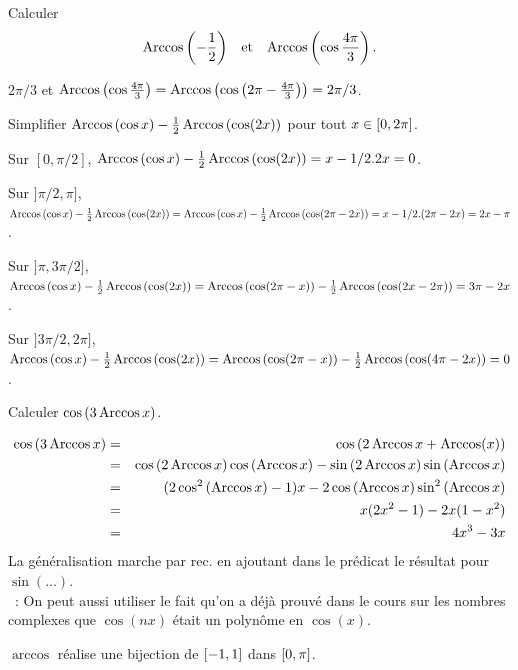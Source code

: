 \documentclass{magnoliaold}
\begin{document}
\begin{exos}
\exemple Calculer
  \[\operatorname{Arccos}\left(-\frac{1}{2}\right) \quad\!\text{et}\quad\! \operatorname{Arccos}\left(\cos\frac{4\pi}{3}\right).\]
  \begin{sol}
  $2\pi/3$ et $\operatorname{Arccos}\left(\cos\frac{4\pi}{3}\right)=\operatorname{Arccos}\left(\cos\left(2\pi-\frac{4\pi}{3}\right)\right)=2\pi/3$.
  \end{sol}
\exemple Simplifier $\operatorname{Arccos}\left(\cos x\right)-\frac{1}{2}\operatorname{Arccos}\left(\cos(2x)\right)$
  pour tout $x\in\left[0,2\pi\right]$.
  \begin{sol}
  Sur $[0,\pi/2]$, $\operatorname{Arccos}\left(\cos x\right)-\frac{1}{2}\operatorname{Arccos}\left(\cos(2x)\right)=x-1/2.2x=0$.
  
  Sur $]\pi/2,\pi]$, $\operatorname{Arccos}\left(\cos x\right)-\frac{1}{2}\operatorname{Arccos}\left(\cos(2x)\right)=\operatorname{Arccos}\left(\cos x\right)-\frac{1}{2}\operatorname{Arccos}\left(\cos(2\pi-2x)\right)=x-1/2.(2\pi-2x)=2x-\pi$.
  
  Sur $]\pi,3\pi/2]$, $\operatorname{Arccos}\left(\cos x\right)-\frac{1}{2}\operatorname{Arccos}\left(\cos(2x)\right)=\operatorname{Arccos}\left(\cos(2\pi- x)\right)-\frac{1}{2}\operatorname{Arccos}\left(\cos(2x-2\pi)\right)=3\pi-2x$.
  
  Sur $]3\pi/2,2\pi]$, $\operatorname{Arccos}\left(\cos x\right)-\frac{1}{2}\operatorname{Arccos}\left(\cos(2x)\right)=\operatorname{Arccos}\left(\cos (2\pi-x)\right)-\frac{1}{2}\operatorname{Arccos}\left(\cos(4\pi-2x)\right)=0$.
  
  \end{sol}
\exemple Calculer $\cos\left(3\operatorname{Arccos} x\right)$.
  \begin{sol}
  \begin{eqnarray*}
  \cos\left(3\operatorname{Arccos} x\right)&=&\cos\left(2\operatorname{Arccos} x+\operatorname{Arccos}(x)\right)\\
  &=&\cos\left(2\operatorname{Arccos} x\right)\cos\left(\operatorname{Arccos} x\right)-\sin\left(2\operatorname{Arccos} x\right)\sin\left(\operatorname{Arccos} x\right)\\
  &=&(2\cos^2\left(\operatorname{Arccos} x\right)-1)x-2\cos\left(\operatorname{Arccos} x\right)\sin^2\left(\operatorname{Arccos} x\right)\\
  &=&x(2x^2-1)-2x(1-x^2)\\
  &=&4x^3-3x
  \end{eqnarray*}
  La généralisation marche par rec. en ajoutant dans le prédicat le résultat pour $\sin(...)$.\\
  ~: On peut aussi utiliser le fait qu'on a déjà prouvé dans le cours sur les nombres complexes que $\cos(nx)$ était un polynôme en $\cos(x)$.
  \end{sol}
\end{exos}

\begin{proposition}[utile=-3]
$\arccos$ réalise une bijection de $\left[-1,1\right]$ dans $\left[0,\pi\right]$.
\end{proposition}
\end{document}
